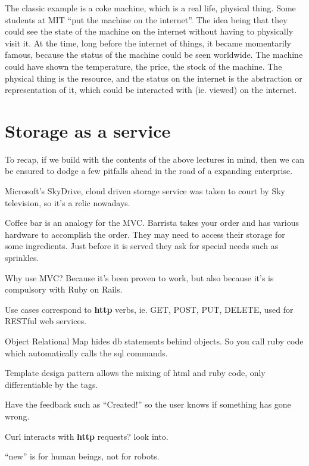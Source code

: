 \documentclass[11pt]{article}
\begin{document}
The classic example is a coke machine, which is a real life, physical thing. Some students at MIT ``put the machine on the internet''. The idea being that they could see the state of the machine on the internet without having to physically visit it. At the time, long before the internet of things, it became momentarily famous, because the status of the machine could be seen worldwide. The machine could have shown the temperature, the price, the stock of the machine. The physical thing is the resource, and the status on the internet is the abstraction or representation of it, which could be interacted with (ie. viewed) on the internet.



\section{Storage as a service}

To recap, if we build with the contents of the above lectures in mind, then we can be ensured to dodge a few pitfalls ahead in the road of a expanding enterprise.

Microsoft’s SkyDrive, cloud driven storage service was taken to court by Sky television, so it’s a relic nowadays.

Coffee bar is an analogy for the MVC. Barrista takes your order and has various hardware to accomplish the order. They may need to access their storage for some ingredients. Just before it is served they ask for special needs such as sprinkles.

Why use MVC? Because it’s been proven to work, but also because it’s is compulsory with Ruby on Rails.

Use cases correspond to \textbf{http} verbs, ie. GET, POST, PUT, DELETE, used for RESTful web services.

Object Relational Map hides db statements behind objects. So you call ruby code which automatically calls the sql commands.

Template design pattern allows the mixing of html and ruby code, only differentiable by the tags.

Have the feedback such as “Created!” so the user knows if something has gone wrong.

Curl interacts with \textbf{http} requests? look into.

“new” is for human beings, not for robots.
\end{document}
